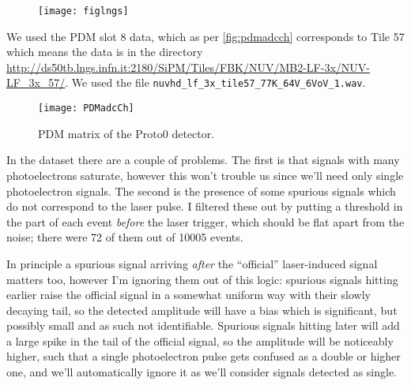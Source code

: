 
\begin{figure}
    \hspace{-0.26\textwidth}\texttt{[image: figlngs]}
    

\end{figure}

We used the PDM slot 8 data, which as per \autoref{fig:pdmadcch} corresponds
to Tile 57 which means the data is in the directory
\url{http://ds50tb.lngs.infn.it:2180/SiPM/Tiles/FBK/NUV/MB2-LF-3x/NUV-LF_3x_57/}. We used the file \nolinkurl{nuvhd_lf_3x_tile57_77K_64V_6VoV_1.wav}.


\begin{figure}
    \texttt{[image: PDMadcCh]}
    
    \caption{\label{fig:pdmadcch} PDM matrix of the Proto0 detector.}

\end{figure}

In the dataset there are a couple of problems. The first is that signals with
many photoelectrons saturate, however this won't trouble us since we'll need
only single photoelectron signals. The second is the presence of some spurious
signals which do not correspond to the laser pulse. I filtered these out by
putting a threshold in the part of each event \emph{before} the laser trigger,
which should be flat apart from the noise; there were 72 of them out of
\num{10005} events.

In principle a spurious signal arriving \emph{after} the ``official''
laser-induced signal matters too, however I'm ignoring them out of this logic:
spurious signals hitting earlier raise the official signal in a somewhat
uniform way with their slowly decaying tail, so the detected amplitude will
have a bias which is significant, but possibly small and as such not
identifiable. Spurious signals hitting later will add a large spike in the tail
of the official signal, so the amplitude will be noticeably higher, such that a
single photoelectron pulse gets confused as a double or higher one, and
we'll automatically ignore it as we'll consider signals detected as single.

